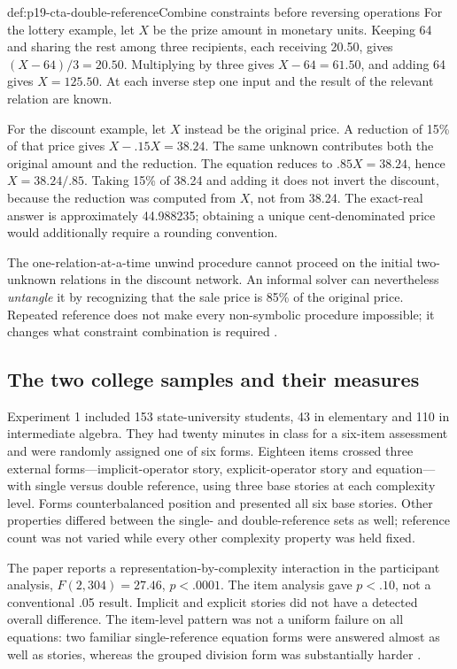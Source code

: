 \begin{hbexample}{def:p19-cta-double-reference}{Combine constraints before reversing operations}
For the lottery example, let \(X\) be the prize amount in monetary
units. Keeping 64 and sharing the rest among three recipients, each
receiving 20.50, gives \((X-64)/3=20.50\).
Multiplying by three gives \(X-64=61.50\), and adding 64 gives
\(X=125.50\). At each inverse step one input and the result of the
relevant relation are known.

For the discount example, let \(X\) instead be the original price.
A reduction of 15\% of that price gives
\(X-.15X=38.24\). The same unknown contributes both the original
amount and the reduction. The equation reduces to
\(.85X=38.24\), hence \(X=38.24/.85\).
Taking 15\% of 38.24 and adding it does not invert the discount,
because the reduction was computed from \(X\), not from 38.24.
The exact-real answer is approximately 44.988235; obtaining a unique
cent-denominated price would additionally require a rounding convention.

The one-relation-at-a-time unwind procedure cannot proceed on the
initial two-unknown relations in the discount network. An informal
solver can nevertheless \emph{untangle} it by recognizing that the
sale price is 85\% of the original price. Repeated reference does
not make every non-symbolic procedure impossible; it changes what
constraint combination is required
\cite[pp.~370--372,388,394 n.~3]{KoedingerAlibaliNathan2008TradeoffsCTA}.
\end{hbexample}

\subsection{The two college samples and their measures}

Experiment 1 included 153 state-university students, 43 in elementary
and 110 in intermediate algebra. They had twenty minutes in class
for a six-item assessment and were randomly assigned one of six forms.
Eighteen items crossed three external forms---implicit-operator story,
explicit-operator story and equation---with single versus double
reference, using three base stories at each complexity level.
Forms counterbalanced position and presented all six base stories.
Other properties differed between the single- and double-reference
sets as well; reference count was not varied while every other
complexity property was held fixed.

The paper reports a representation-by-complexity interaction in the
participant analysis, \(F(2,304)=27.46\), \(p<.0001\).
The item analysis gave \(p<.10\), not a conventional .05 result.
Implicit and explicit stories did not have a detected overall
difference. The item-level pattern was not a uniform failure on all
equations: two familiar single-reference equation forms were answered
almost as well as stories, whereas the grouped division form was
substantially harder \cite[pp.~372--378]{KoedingerAlibaliNathan2008TradeoffsCTA}.


